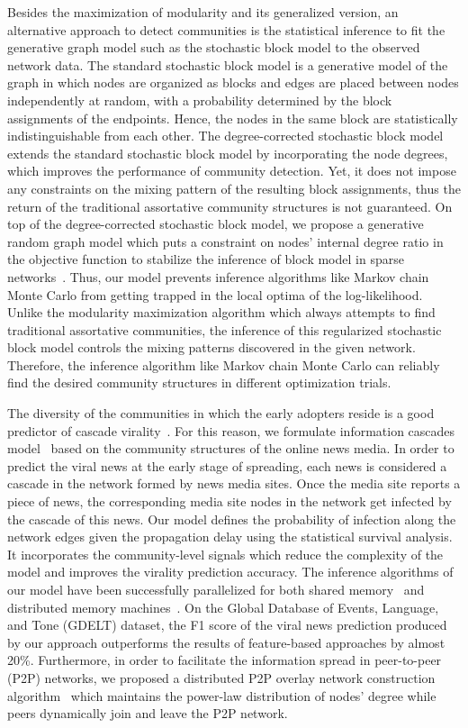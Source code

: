 Besides the maximization of modularity and its generalized version, an alternative approach to detect communities is the statistical inference to fit the generative graph model such as the stochastic block model to the observed network data. The standard stochastic block model is a generative model of the graph in which nodes are organized as blocks and edges are placed between nodes independently at random, with a probability determined by the block assignments of the endpoints. Hence, the nodes in the same block are statistically indistinguishable from each other. The degree-corrected stochastic block model extends the standard stochastic block model by incorporating the node degrees, which improves the performance of community detection. Yet, it does not impose any constraints on the mixing pattern of the resulting block assignments, thus the return of the traditional assortative community structures is not guaranteed. On top of the degree-corrected stochastic block model, we propose a generative random graph model which puts a constraint on nodes' internal degree ratio in the objective function to stabilize the inference of block model in sparse networks~\cite{lu2019regularized}. Thus, our model prevents inference algorithms like Markov chain Monte Carlo from getting trapped in the local optima of the log-likelihood. Unlike the modularity maximization algorithm which always attempts to find traditional assortative communities, the inference of this regularized stochastic block model controls the mixing patterns discovered in the given network. Therefore, the inference algorithm like Markov chain Monte Carlo can reliably find the desired community structures in different optimization trials.

The diversity of the communities in which the early adopters reside is a good predictor of cascade virality~\cite{saxena2015understanding}. For this reason, we formulate information cascades model~\cite{lu2017predicting} based on the community structures of the online news media. In order to predict the viral news at the early stage of spreading, each news is considered a cascade in the network formed by news media sites. Once the media site reports a piece of news, the corresponding media site nodes in the network get infected by the cascade of this news. Our model defines the probability of infection along the network edges given the propagation delay using the statistical survival analysis. It incorporates the community-level signals which reduce the complexity of the model and improves the virality prediction accuracy. The inference algorithms of our model have been successfully parallelized for both shared memory~\cite{lu2017predicting} and distributed memory machines~\cite{lu2018scalable}. On the Global Database of Events, Language, and Tone (GDELT) dataset, the F1 score of the viral news prediction produced by our approach outperforms the results of feature-based approaches by almost 20\%. Furthermore, in order to facilitate the information spread in peer-to-peer (P2P) networks, we proposed a distributed P2P overlay network construction algorithm~\cite{lu2016towards} which maintains the power-law distribution of nodes’ degree while peers dynamically join and leave the P2P network.

